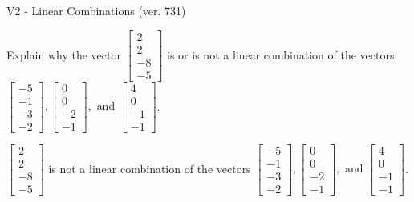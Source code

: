 \begin{exercise}
  \begin{exerciseTitle}V2 - Linear Combinations (ver. 731)\end{exerciseTitle}
  \begin{exerciseStatement}
    Explain why the vector \(\left[\begin{array}{c}
2 \\
2 \\
-8 \\
-5
\end{array}\right]\)  is or is not a linear 
	combination of the vectors \(\left[\begin{array}{c}
-5 \\
-1 \\
-3 \\
-2
\end{array}\right] , \left[\begin{array}{c}
0 \\
0 \\
-2 \\
-1
\end{array}\right] , \text{ and } \left[\begin{array}{c}
4 \\
0 \\
-1 \\
-1
\end{array}\right]\).
	


  \end{exerciseStatement}
  \begin{exerciseAnswer}
   \(\left[\begin{array}{c}
2 \\
2 \\
-8 \\
-5
\end{array}\right]\) 
  	 is not  
	a linear combination of the vectors \(\left[\begin{array}{c}
-5 \\
-1 \\
-3 \\
-2
\end{array}\right] , \left[\begin{array}{c}
0 \\
0 \\
-2 \\
-1
\end{array}\right] , \text{ and } \left[\begin{array}{c}
4 \\
0 \\
-1 \\
-1
\end{array}\right]\).

	
  


  \end{exerciseAnswer}
\end{exercise}